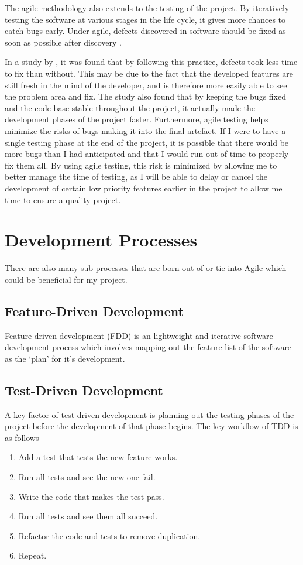 The agile methodology also extends to the testing of the project.
By iteratively testing the software at various stages in the life cycle, it gives more chances to catch bugs early.
Under agile, defects discovered in software should be fixed as soon as possible after discovery \citep{beck2001agile}.

In a study by \cite{talby2006}, it was found that by following this practice, defects took less time to fix than without.
This may be due to the fact that the developed features are still fresh in the mind of the developer, and is therefore more easily able to see the problem area and fix.
The study also found that by keeping the bugs fixed and the code base stable throughout the project, it actually made the development phases of the project faster.
Furthermore, agile testing helps minimize the risks of bugs making it into the final artefact. 
If I were to have a single testing phase at the end of the project, it is possible that there would be more bugs than I had anticipated and that I would run out of time to properly fix them all. 
By using agile testing, this risk is minimized by allowing me to better manage the time of testing, as I will be able to delay or cancel the development of certain low priority features earlier in the project to allow me time to ensure a quality project.

\section{Development Processes}
There are also many sub-processes that are born out of or tie into Agile which could be beneficial for my project.

\subsection{Feature-Driven Development}
Feature-driven development (FDD) is an lightweight and iterative software development process which involves mapping out the feature list of the software as the `plan' for it's development.


\subsection{Test-Driven Development}
A key factor of test-driven development is planning out the testing phases of the project before the development of that phase begins.
The key workflow of TDD is as follows \citep{Beck:2002:TDD:579193}
\begin{enumerate}
	\item Add a test that tests the new feature works.
	\item Run all tests and see the new one fail.
	\item Write the code that makes the test pass.
	\item Run all tests and see them all succeed.
	\item Refactor the code and tests to remove duplication.
	\item Repeat.
\end{enumerate}

